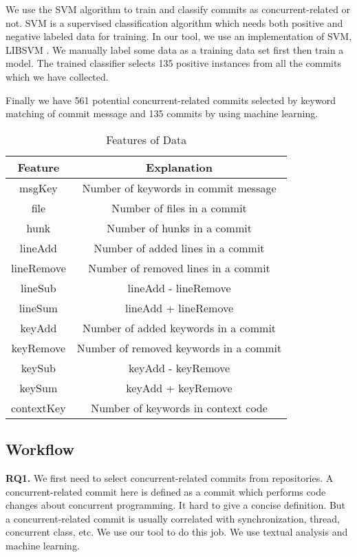 We use the SVM \cite{journals/ml/CortesV95} algorithm to train and classify commits as concurrent-related or not. SVM is a supervised classification algorithm which needs both positive and negative labeled data for training. In our tool, we use an implementation of SVM, LIBSVM \cite{libsvm}. We manually label some data as a training data set first then train a model. The trained classifier selects 135 positive instances from all the commits which we have collected.

Finally we have 561 potential concurrent-related commits selected by keyword matching of commit message and 135 commits by using machine learning.

\begin{table}
	\centering
	\caption{Features of Data}
	\begin{tabular}{|c|c|}\hline
		Feature&Explanation\\\hline
		msgKey&Number of keywords in commit message\\\hline
		file&Number of files in a commit\\\hline
		hunk&Number of hunks in a commit\\\hline
		lineAdd&Number of added lines in a commit\\\hline
		lineRemove&Number of removed lines in a commit\\\hline
		lineSub&lineAdd - lineRemove\\\hline
		lineSum&lineAdd + lineRemove\\\hline
		keyAdd&Number of added keywords in a commit\\\hline
		keyRemove&Number of removed keywords in a commit\\\hline
		keySub&keyAdd - keyRemove\\\hline
		keySum&keyAdd + keyRemove\\\hline
		contextKey&Number of keywords in context code\\\hline
	\end{tabular}
\end{table}

\subsection{Workflow}
\label{sec:method:steps}
\textbf{RQ1.} We first need to select concurrent-related commits from repositories. A concurrent-related commit here is defined as a commit which performs code changes about concurrent programming. It hard to give a concise definition. But a concurrent-related commit is usually correlated with synchronization, thread, concurrent class, etc. We use our tool to do this job. We use textual analysis and machine learning.

